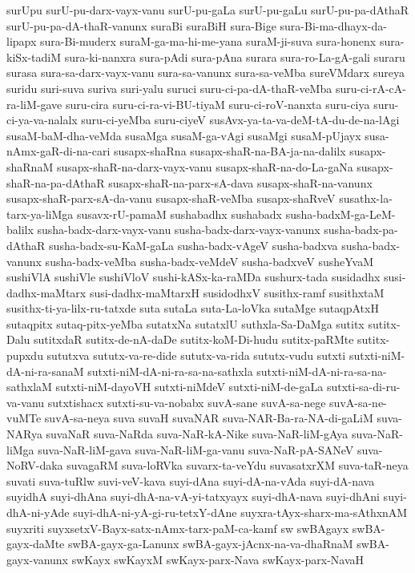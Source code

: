 {surUpu
surU-pu-darx-vayx-vanu
surU-pu-gaLa
surU-pu-gaLu
surU-pu-pa-dAthaR
surU-pu-pa-dA-thaR-vanunx
suraBi
suraBiH
sura-Bige
sura-Bi-ma-dhayx-da-lipapx
sura-Bi-muderx
suraM-ga-ma-hi-me-yana
suraM-ji-suva
sura-honenx
sura-kiSx-tadiM
sura-ki-nanxra
sura-pAdi
sura-pAna
surara
sura-ro-La-gA-gali
suraru
surasa
sura-sa-darx-vayx-vanu
sura-sa-vanunx
sura-sa-veMba
sureVMdarx
sureya
suridu
suri-suva
suriva
suri-yalu
suruci
suru-ci-pa-dA-thaR-veMba
suru-ci-rA-cA-ra-liM-gave
suru-cira
suru-ci-ra-vi-BU-tiyaM
suru-ci-roV-nanxta
suru-ciya
suru-ci-ya-va-nalalx
suru-ci-yeMba
suru-ciyeV
susAvx-ya-ta-va-deM-tA-du-de-na-lAgi
susaM-baM-dha-veMda
susaMga
susaM-ga-vAgi
susaMgi
susaM-pUjayx
susa-nAmx-gaR-di-na-cari
susapx-shaRna
susapx-shaR-na-BA-ja-na-dalilx
susapx-shaRnaM
susapx-shaR-na-darx-vayx-vanu
susapx-shaR-na-do-La-gaNa
susapx-shaR-na-pa-dAthaR
susapx-shaR-na-parx-sA-dava
susapx-shaR-na-vanunx
susapx-shaR-parx-sA-da-vanu
susapx-shaR-veMba
susapx-shaRveV
susathx-la-tarx-ya-liMga
susavx-rU-pamaM
sushabadhx
sushabadx
susha-badxM-ga-LeM-balilx
susha-badx-darx-vayx-vanu
susha-badx-darx-vayx-vanunx
susha-badx-pa-dAthaR
susha-badx-su-KaM-gaLa
susha-badx-vAgeV
susha-badxva
susha-badx-vanunx
susha-badx-veMba
susha-badx-veMdeV
susha-badxveV
susheYvaM
sushiVlA
sushiVle
sushiVloV
sushi-kASx-ka-raMDa
sushurx-tada
susidadhx
susi-dadhx-maMtarx
susi-dadhx-maMtarxH
susidodhxV
susithx-ramf
susithxtaM
susithx-ti-ya-lilx-ru-tatxde
suta
sutaLa
suta-La-loVka
sutaMge
sutaqpAtxH
sutaqpitx
sutaq-pitx-yeMba
sutatxNa
sutatxlU
suthxla-Sa-DaMga
sutitx
sutitx-Dalu
sutitxdaR
sutitx-de-nA-daDe
sutitx-koM-Di-hudu
sutitx-paRMte
sutitx-pupxdu
sututxva
sututx-va-re-dide
sututx-va-rida
sututx-vudu
sutxti
sutxti-niM-dA-ni-ra-sanaM
sutxti-niM-dA-ni-ra-sa-na-sathxla
sutxti-niM-dA-ni-ra-sa-na-sathxlaM
sutxti-niM-dayoVH
sutxti-niMdeV
sutxti-niM-de-gaLa
sutxti-sa-di-ru-va-vanu
sutxtishacx
sutxti-su-va-nobabx
suvA-sane
suvA-sa-nege
suvA-sa-ne-vuMTe
suvA-sa-neya
suva
suvaH
suvaNAR
suva-NAR-Ba-ra-NA-di-gaLiM
suva-NARya
suvaNaR
suva-NaRda
suva-NaR-kA-Nike
suva-NaR-liM-gAya
suva-NaR-liMga
suva-NaR-liM-gava
suva-NaR-liM-ga-vanu
suva-NaR-pA-SANeV
suva-NoRV-daka
suvagaRM
suva-loRVka
suvarx-ta-veYdu
suvasatxrXM
suva-taR-neya
suvati
suva-tuRlw
suvi-veV-kava
suyi-dAna
suyi-dA-na-vAda
suyi-dA-nava
suyidhA
suyi-dhAna
suyi-dhA-na-vA-yi-tatxyayx
suyi-dhA-nava
suyi-dhAni
suyi-dhA-ni-yAde
suyi-dhA-ni-yA-gi-ru-tetxY-dAne
suyxra-tAyx-sharx-ma-sAthxnAM
suyxriti
suyxsetxV-Bayx-satx-nAmx-tarx-paM-ca-kamf
sw
swBAgayx
swBA-gayx-daMte
swBA-gayx-ga-Lanunx
swBA-gayx-jAcnx-na-va-dhaRnaM
swBA-gayx-vanunx
swKayx
swKayxM
swKayx-parx-Nava
swKayx-parx-NavaH
}
